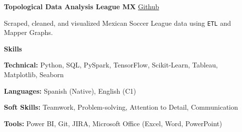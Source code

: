 \documentclass[6pt]{article}
\begin{document}
\textbf{Topological Data Analysis League MX} \hfill \href{https://github.com/erick-rios/topological_data_analysis_mx_league}{Github}

Scraped, cleaned, and visualized Mexican Soccer League data using \texttt{ETL} and Mapper Graphs.

\vspace{10pt}
\begin{center}
    \textbf{Skills}
\end{center}
\textbf{Technical:} Python, SQL, PySpark, TensorFlow, Scikit-Learn, Tableau, Matplotlib, Seaborn

\textbf{Languages:} Spanish (Native), English (C1)

\textbf{Soft Skills:} Teamwork, Problem-solving, Attention to Detail, Communication

\textbf{Tools:} Power BI, Git, JIRA, Microsoft Office (Excel, Word, PowerPoint)
\end{document}
